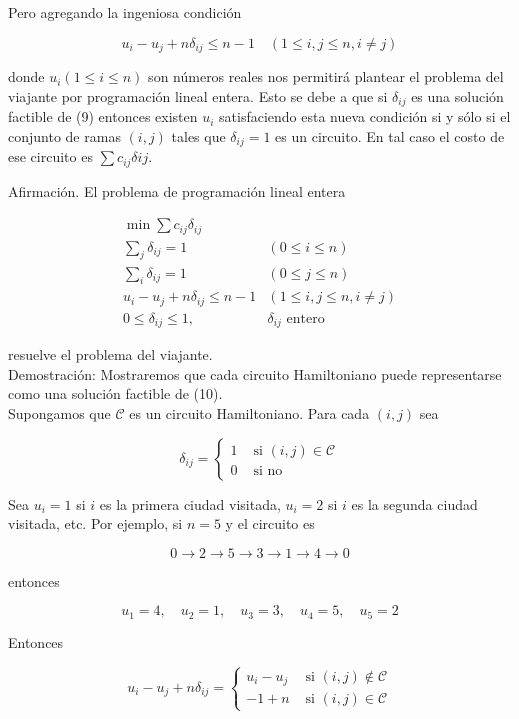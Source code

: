 \documentclass[10pt]{article}
\begin{document}
Pero agregando la ingeniosa condición

$$
u_{i}-u_{j}+n \delta_{i j} \leq n-1 \quad(1 \leq i, j \leq n, i \neq j)
$$

donde $u_{i}(1 \leq i \leq n)$ son números reales nos permitirá plantear el problema del viajante por programación lineal entera. Esto se debe a que si $\delta_{i j}$ es una solución factible de (9) entonces existen $u_{i}$ satisfaciendo esta nueva condición si y sólo si el conjunto de ramas $(i, j)$ tales que $\delta_{i j}=1$ es un circuito. En tal caso el costo de ese circuito es $\sum c_{i j} \delta i j$.

Afirmación. El problema de programación lineal entera


\begin{align*}
\min \sum c_{i j} \delta_{i j} & \\
\sum_{j} \delta_{i j}=1 & (0 \leq i \leq n) \\
\sum_{i} \delta_{i j}=1 & (0 \leq j \leq n)  \tag{10}\\
u_{i}-u_{j}+n \delta_{i j} \leq n-1 & (1 \leq i, j \leq n, i \neq j) \\
0 \leq \delta_{i j} \leq 1, & \delta_{i j} \text { entero }
\end{align*}


resuelve el problema del viajante.\\
Demostración: Mostraremos que cada circuito Hamiltoniano puede representarse como una solución factible de (10).\\
Supongamos que $\mathcal{C}$ es un circuito Hamiltoniano. Para cada $(i, j)$ sea

$$
\delta_{i j}= \begin{cases}1 & \text { si }(i, j) \in \mathcal{C} \\ 0 & \text { si no }\end{cases}
$$

Sea $u_{i}=1$ si $i$ es la primera ciudad visitada, $u_{i}=2$ si $i$ es la segunda ciudad visitada, etc. Por ejemplo, si $n=5$ y el circuito es

$$
0 \longrightarrow 2 \longrightarrow 5 \longrightarrow 3 \longrightarrow 1 \longrightarrow 4 \longrightarrow 0
$$

entonces

$$
u_{1}=4, \quad u_{2}=1, \quad u_{3}=3, \quad u_{4}=5, \quad u_{5}=2
$$

Entonces

$$
u_{i}-u_{j}+n \delta_{i j}= \begin{cases}u_{i}-u_{j} & \text { si }(i, j) \notin \mathcal{C} \\ -1+n & \text { si }(i, j) \in \mathcal{C}\end{cases}
$$
\end{document}
